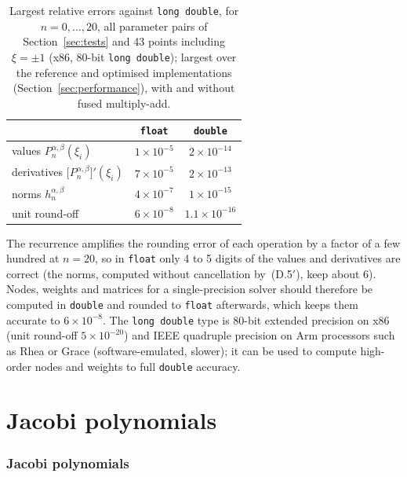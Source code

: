 \documentclass[11pt,a4paper]{article}
\newcommand{\Pab}[1]{P_{#1}^{\alpha,\beta}}     %
\newcommand{\code}[1]{\texttt{#1}}
\begin{document}
\begin{table}[h]
\centering
\begin{tabular}{@{}lcc@{}}
\toprule
& \code{float} & \code{double} \\
\midrule
values $\Pab{n}(\xi_i)$                    & $1\times10^{-5}$ & $2\times10^{-14}$ \\
derivatives $\bigl[\Pab{n}\bigr]'(\xi_i)$  & $7\times10^{-5}$ & $2\times10^{-13}$ \\
norms $h_n^{\alpha,\beta}$                 & $4\times10^{-7}$ & $1\times10^{-15}$ \\
\midrule
unit round-off                              & $6\times10^{-8}$ & $1.1\times10^{-16}$ \\
\bottomrule
\end{tabular}
\caption{Largest relative errors against \code{long double}, for
$n=0,\dots,20$, all parameter pairs of Section~\ref{sec:tests} and 43 points
including $\xi=\pm1$ (x86, 80-bit \code{long double}); largest over the
reference and optimised implementations (Section~\ref{sec:performance}), with
and without fused multiply-add.}
\label{tab:precision}
\end{table}

The recurrence amplifies the rounding error of each operation by a factor of
a few hundred at $n=20$, so in \code{float} only 4 to 5 digits of the values
and derivatives are correct (the norms, computed without cancellation by~(D.5$'$),
keep about 6). Nodes,
weights and matrices for a single-precision solver should therefore be
computed in \code{double} and rounded to \code{float} afterwards, which keeps
them accurate to $6\times10^{-8}$. The \code{long double} type is 80-bit
extended precision on x86 (unit round-off $5\times10^{-20}$) and IEEE
quadruple precision on Arm processors such as Rhea or Grace
(software-emulated, slower); it can be used to compute high-order nodes and
weights to full \code{double} accuracy.

\part{Jacobi polynomials}
\section{Jacobi polynomials}
\label{sec:jacobi}
\end{document}
